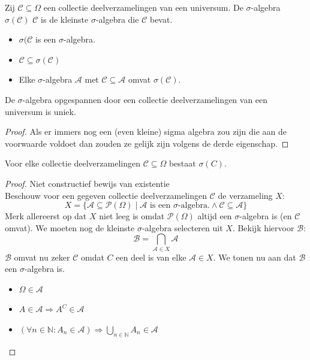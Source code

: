 \documentclass[main.tex]{subfiles}
\begin{document}
\begin{de}
  Zij $\mathcal{C} \subseteq \Omega$ een collectie deelverzamelingen van een universum.
  De $\sigma$-algebra $\sigma(\mathcal{C})$  $\mathcal{C}$ is de kleinste $\sigma$-algebra die $\mathcal{C}$ bevat.

  \begin{itemize}
  \item $\sigma(\mathcal{C}$ is een $\sigma$-algebra.
  \item $\mathcal{C} \subseteq \sigma(\mathcal{C})$
  \item Elke $\sigma$-algebra $\mathcal{A}$ met $\mathcal{C} \subseteq \mathcal{A}$ omvat $\sigma(\mathcal{C})$.
  \end{itemize}
\end{de}

\begin{st}
  De $\sigma$-algebra opgespannen door een collectie deelverzamelingen van een universum is uniek.

  \begin{proof}
    Als er immers nog een (even kleine) sigma algebra zou zijn die aan de voorwaarde voldoet dan zouden ze gelijk zijn volgens de derde eigenschap.
  \end{proof}
\end{st}

\begin{ei}
  Voor elke collectie deelverzamelingen $\mathcal{C} \subseteq \Omega$ bestaat $\sigma(C)$.

  \begin{proof}
    Niet constructief bewijs van existentie\\
    Beschouw voor een gegeven collectie deelverzamelingen $\mathcal{C}$ de verzameling $X$:
    \[ X = \{ \mathcal{A} \subseteq \mathcal{P}(\Omega) \mid \mathcal{A} \text{ is een $\sigma$-algebra.} \wedge \mathcal{C} \subseteq \mathcal{A} \} \]
    Merk allereerst op dat $X$ niet leeg is omdat $\mathcal{P}(\Omega)$ altijd een $\sigma$-algebra is (en $\mathcal{C}$ omvat).
    We moeten nog de kleinste $\sigma$-algebra selecteren uit $X$.
    Bekijk hiervoor $\mathcal{B}$:
    \[ \mathcal{B} = \bigcap_{\mathcal{A} \in X}\mathcal{A} \]
    $\mathcal{B}$ omvat nu zeker $\mathcal{C}$ omdat $C$ een deel is van elke $\mathcal{A} \in X$.
    We tonen nu aan dat $\mathcal{B}$ een $\sigma$-algebra is.
    \begin{itemize}
    \item $\Omega \in \mathcal{A}$
    \item $A \in \mathcal{A} \Rightarrow A^{C} \in \mathcal{A}$
    \item $(\forall n\in \mathbb{N}: A_{n}\in \mathcal{A}) \Rightarrow \bigcup_{n\in \mathbb{N}} A_{n} \in \mathcal{A}$
    \end{itemize}
  \end{proof}
\end{ei}
\end{document}
